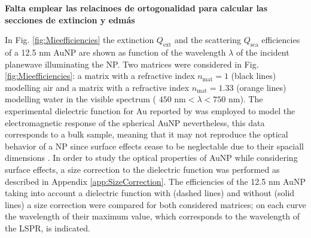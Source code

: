 
\textbf{Falta emplear las relacinoes de ortogonalidad para calcular las secciones de extincion y edmás}
\clearpage


In Fig. \ref{fig:Mieefficiencies} the extinction  $Q_\text{ext}$ and the scattering  $Q_\text{sca}$ efficiencies of a 12.5 nm AuNP are shown as function of the wavelength $\lambda$ of the incident planewave illuminating the NP. Two matrices were considered in Fig. \ref{fig:Mieefficiencies}: a matrix with a refractive index $n_\text{mat} = 1$ (black lines) modelling air and a matrix with a refractive index $n_\text{mat} = 1.33$ (orange lines) modelling water in the visible spectrum ( $450\text{ nm} < \lambda < 750 \text{ nm}$).  The experimental dielectric function for Au reported by \citeauthor{johnson_optical_1972} \cite{johnson_optical_1972}  was employed to model the electromagnetic response of the spherical AuNP nevertheless, this data corresponds to a bulk sample, meaning that it may not reproduce the optical behavior of a NP since surface effects cease to be neglectable  due to their spaciall dimensions \cite{noguez_surface_2007}.   In order to study  the optical properties of AuNP while considering  surface effects,  a size correction to the dielectric function was performed as described in Appendix \ref{app:SizeCorrection}. The efficiencies of the 12.5 nm AuNP  taking into account a dielectric function with (dashed lines) and without (solid lines) a size correction were compared for both considered matrices; on each curve the wavelength of their maximum value, which corresponds to the wavelength of the LSPR, is indicated.


